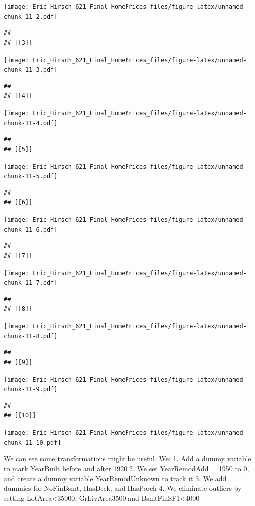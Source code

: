\documentclass[
]{article}
\begin{document}
\texttt{[image: Eric\_Hirsch\_621\_Final\_HomePrices\_files/figure-latex/unnamed-chunk-11-2.pdf]}

\begin{verbatim}
## 
## [[3]]
\end{verbatim}

\texttt{[image: Eric\_Hirsch\_621\_Final\_HomePrices\_files/figure-latex/unnamed-chunk-11-3.pdf]}

\begin{verbatim}
## 
## [[4]]
\end{verbatim}

\texttt{[image: Eric\_Hirsch\_621\_Final\_HomePrices\_files/figure-latex/unnamed-chunk-11-4.pdf]}

\begin{verbatim}
## 
## [[5]]
\end{verbatim}

\texttt{[image: Eric\_Hirsch\_621\_Final\_HomePrices\_files/figure-latex/unnamed-chunk-11-5.pdf]}

\begin{verbatim}
## 
## [[6]]
\end{verbatim}

\texttt{[image: Eric\_Hirsch\_621\_Final\_HomePrices\_files/figure-latex/unnamed-chunk-11-6.pdf]}

\begin{verbatim}
## 
## [[7]]
\end{verbatim}

\texttt{[image: Eric\_Hirsch\_621\_Final\_HomePrices\_files/figure-latex/unnamed-chunk-11-7.pdf]}

\begin{verbatim}
## 
## [[8]]
\end{verbatim}

\texttt{[image: Eric\_Hirsch\_621\_Final\_HomePrices\_files/figure-latex/unnamed-chunk-11-8.pdf]}

\begin{verbatim}
## 
## [[9]]
\end{verbatim}

\texttt{[image: Eric\_Hirsch\_621\_Final\_HomePrices\_files/figure-latex/unnamed-chunk-11-9.pdf]}

\begin{verbatim}
## 
## [[10]]
\end{verbatim}

\texttt{[image: Eric\_Hirsch\_621\_Final\_HomePrices\_files/figure-latex/unnamed-chunk-11-10.pdf]}

We can see some transformations might be useful. We: 1. Add a dummy
variable to mark YearBuilt before and after 1920 2. We set YearRemodAdd
= 1950 to 0, and create a dummy variable YearRemodUnknown to track it 3.
We add dummies for NoFinBsmt, HasDeck, and HasPorch 4. We eliminate
outliers by setting LotArea\textless35000, GrLivArea3500 and
BsmtFinSF1\textless4000
\end{document}
